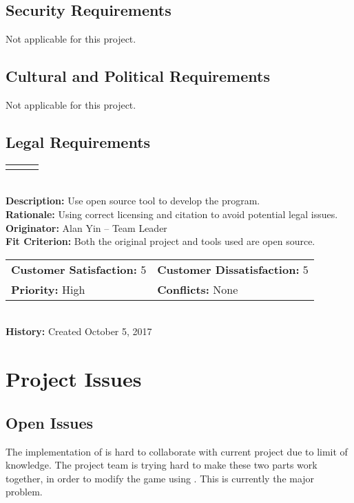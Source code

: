 \documentclass[12pt]{article}
\begin{document}
\subsection{Security Requirements}
Not applicable for this project.


\subsection{Cultural and Political Requirements}
Not applicable for this project.



\subsection{Legal Requirements}

\begin{reqbox}
\begin{tabular}{ccc}\color{red}{UFR08}
\end{tabular} \\
\textbf{Description:} Use open source tool to develop the program.\\
\textbf{Rationale:} Using correct licensing and citation to avoid potential legal issues.\\
\textbf{Originator:} Alan Yin -- Team Leader \\
\textbf{Fit Criterion:} Both the original project and tools used are open source.\\
\begin{tabular}{ll}
\textbf{Customer Satisfaction:} 5 & \textbf{Customer Dissatisfaction:} 5 \\
\textbf{Priority:} High & \textbf{Conflicts:} None\\
\end{tabular} \\
\textbf{History:} Created October 5, 2017
\end{reqbox}


\section{Project Issues}

\subsection{Open Issues}
The implementation of \color{red}{Slick2D} is hard to collaborate with current project due to limit of knowledge. The project team is trying hard to make these two parts work together, in order to modify the game using \color{red}{Slick2D}. This is currently the major problem.
\end{document}
